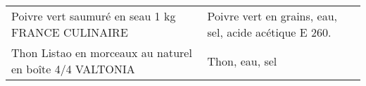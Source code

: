 \begin{longtable}{p{5cm}p{10cm}}
                                                        Poivre vert saumuré en seau 1 kg FRANCE CULINAIRE &                                                                                                                                                                                                                                                                                                                                                                                                                                                                                                                                                                                                                                                                                                                                                                                                                                                                                                                                                                                   Poivre vert en grains, eau, sel, acide acétique E 260. \\
                                                 Thon Listao en morceaux au naturel en boîte 4/4 VALTONIA &                                                                                                                                                                                                                                                                                                                                                                                                                                                                                                                                                                                                                                                                                                                                                                                                                                                                                                                                                                                                                           Thon, eau, sel \\

\end{longtable}
